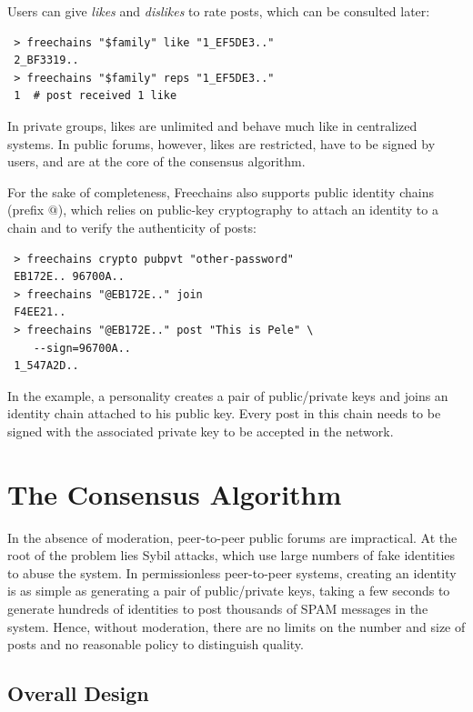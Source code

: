 \documentclass[10pt,journal,compsoc]{IEEEtran}
\newcommand{\FC}       {Freechains\xspace}
\begin{document}
Users can give \emph{likes} and \emph{dislikes} to rate posts, which can be
consulted later:

{\footnotesize
\begin{verbatim}
 > freechains "$family" like "1_EF5DE3.."
 2_BF3319..
 > freechains "$family" reps "1_EF5DE3.."
 1  # post received 1 like
\end{verbatim}
}

In private groups, likes are unlimited and behave much like in centralized
systems.
In public forums, however, likes are restricted, have to be signed by users,
and are at the core of the consensus algorithm.

For the sake of completeness, \FC also supports public identity chains (prefix
$@$), which relies on public-key cryptography to attach an identity to a chain
and to verify the authenticity of posts:

{\footnotesize
\begin{verbatim}
 > freechains crypto pubpvt "other-password"
 EB172E.. 96700A..
 > freechains "@EB172E.." join
 F4EE21..
 > freechains "@EB172E.." post "This is Pele" \
    --sign=96700A..
 1_547A2D..
\end{verbatim}
}

In the example, a personality creates a pair of public/private keys and joins
an identity chain attached to his public key.
Every post in this chain needs to be signed with the associated private key to
be accepted in the network.

\section{The Consensus Algorithm}
\label{sec.consensus}

In the absence of moderation, peer-to-peer public forums are impractical.
At the root of the problem lies Sybil attacks, which use large numbers of fake
identities to abuse the system.
In permissionless peer-to-peer systems, creating an identity is as simple as
generating a pair of public/private keys, taking a few seconds to generate
hundreds of identities to post thousands of SPAM messages in the system.
Hence, without moderation, there are no limits on the number and size of posts
and no reasonable policy to distinguish quality.

\subsection{Overall Design}
\end{document}

